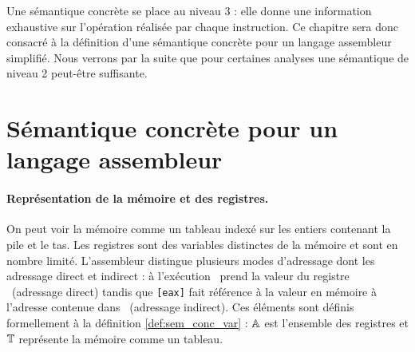 Une sémantique concrète se place au niveau 3 : elle donne une information exhaustive sur l'opération réalisée par chaque instruction.
Ce chapitre sera donc consacré à la définition d'une sémantique concrète pour un langage assembleur simplifié.
Nous verrons par la suite que pour certaines analyses une sémantique de niveau 2 peut-être suffisante.

\section{Sémantique concrète pour un langage assembleur}
\paragraph{Représentation de la mémoire et des registres.}
On peut voir la mémoire comme un tableau indexé sur les entiers contenant la pile et le tas. Les registres sont des variables distinctes de la mémoire et sont en nombre limité.
L'assembleur distingue plusieurs modes d'adressage dont les adressage direct et indirect : à l'exécution \eax\ prend la valeur du registre \eax\ (adressage direct) tandis que \texttt{[eax]} fait référence à la valeur en mémoire à l'adresse contenue dans \eax\ (adressage indirect).
Ces éléments sont définis formellement à la définition \ref{def:sem_conc_var} : $\mathbb A$ est l'ensemble des registres et $\mathbb T$ représente la mémoire comme un tableau.




